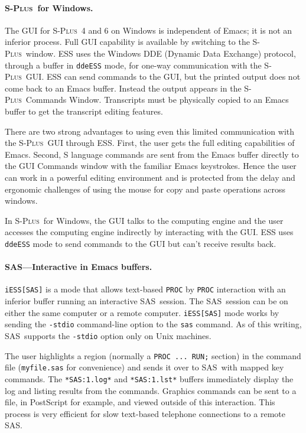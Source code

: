 \documentclass{article}
\newcommand*{\SAS}{\textsc{SAS}}
\newcommand*{\Splus}{\textsc{S-Plus}}
\newcommand{\stexttt}[1]{{\small\texttt{#1}}}
\begin{document}
\paragraph{\Splus\ for Windows.}
The GUI for \Splus\ 4 and 6 on Windows is independent of Emacs; it is not
an inferior process.  Full GUI
capability is available by switching to the \Splus\ window.
ESS uses the Windows DDE (Dynamic Data Exchange) protocol,
through a buffer in \stexttt{ddeESS} mode, for one-way communication with
the \Splus\ GUI.
ESS can send commands to the GUI, but the printed
output does not come back to an Emacs buffer.  Instead the output appears in
the \Splus\ Commands Window.  Transcripts must be physically copied to
an Emacs buffer to get the transcript editing features.

There are two strong advantages to using even this limited communication
with the \Splus\ GUI through ESS.  First, the user gets the full
editing capabilities of Emacs.  Second, S language commands are sent
from the Emacs buffer directly to the GUI Commands window with the
familiar Emacs keystrokes.  Hence the user can work in a powerful
editing environment and is protected from the delay and ergonomic
challenges of using the mouse for copy and paste operations across
windows.

In \Splus\ for Windows, the GUI
talks to the computing engine and the user accesses the computing
engine indirectly by interacting with the GUI.  ESS uses
\stexttt{ddeESS} mode to send commands to the GUI but can't receive
results back.

\paragraph{\SAS---Interactive in Emacs buffers.}

\stexttt{iESS[SAS]} is a mode that allows text-based \stexttt{PROC} by
\stexttt{PROC} interaction with an inferior buffer running an
interactive \SAS\ session.  The \SAS\ session can be on either the
same computer or a remote computer.  \stexttt{iESS[SAS]} mode works by
sending the \stexttt{-stdio} command-line option to the \stexttt{sas}
command.  As of this writing, \SAS\ supports the \stexttt{-stdio} option
only on Unix machines.

The user highlights a region (normally a \stexttt{PROC ... RUN;}
section) in the command file (\stexttt{myfile.sas} for convenience)
and sends it over to \SAS\ with mapped key commands.  The
\stexttt{*SAS:1.log*} and \stexttt{*SAS:1.lst*} buffers immediately
display the log and listing results from the commands.
Graphics commands can be sent to a file, in PostScript for example,
and viewed outside of this interaction.  This process is very efficient
for slow text-based telephone connections to a remote \SAS.
\end{document}
